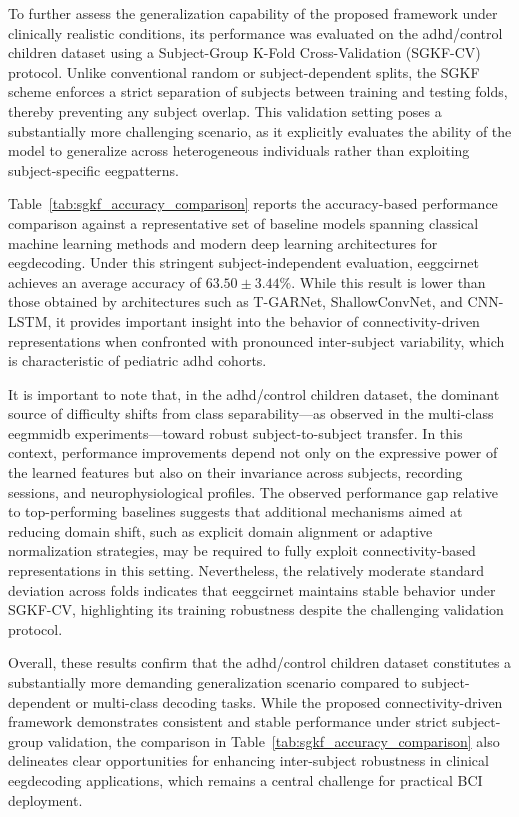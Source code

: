 To further assess the generalization capability of the proposed framework under clinically realistic conditions, its performance was evaluated on the \gls{adhd}/control children dataset using a Subject-Group K-Fold Cross-Validation (SGKF-CV) protocol. Unlike conventional random or subject-dependent splits, the SGKF scheme enforces a strict separation of subjects between training and testing folds, thereby preventing any subject overlap. This validation setting poses a substantially more challenging scenario, as it explicitly evaluates the ability of the model to generalize across heterogeneous individuals rather than exploiting subject-specific \gls{eeg}patterns.

Table~\ref{tab:sgkf_accuracy_comparison} reports the accuracy-based performance comparison against a representative set of baseline models spanning classical machine learning methods and modern deep learning architectures for \gls{eeg}decoding. Under this stringent subject-independent evaluation, \gls{eeggcirnet} achieves an average accuracy of $63.50 \pm 3.44\%$. While this result is lower than those obtained by architectures such as T-GARNet, ShallowConvNet, and CNN-LSTM, it provides important insight into the behavior of connectivity-driven representations when confronted with pronounced inter-subject variability, which is characteristic of pediatric \gls{adhd} cohorts.

It is important to note that, in the \gls{adhd}/control children dataset, the dominant source of difficulty shifts from class separability—as observed in the multi-class \gls{eegmmidb} experiments—toward robust subject-to-subject transfer. In this context, performance improvements depend not only on the expressive power of the learned features but also on their invariance across subjects, recording sessions, and neurophysiological profiles. The observed performance gap relative to top-performing baselines suggests that additional mechanisms aimed at reducing domain shift, such as explicit domain alignment or adaptive normalization strategies, may be required to fully exploit connectivity-based representations in this setting. Nevertheless, the relatively moderate standard deviation across folds indicates that \gls{eeggcirnet} maintains stable behavior under SGKF-CV, highlighting its training robustness despite the challenging validation protocol.

Overall, these results confirm that the \gls{adhd}/control children dataset constitutes a substantially more demanding generalization scenario compared to subject-dependent or multi-class decoding tasks. While the proposed connectivity-driven framework demonstrates consistent and stable performance under strict subject-group validation, the comparison in Table~\ref{tab:sgkf_accuracy_comparison} also delineates clear opportunities for enhancing inter-subject robustness in clinical \gls{eeg}decoding applications, which remains a central challenge for practical BCI deployment.

